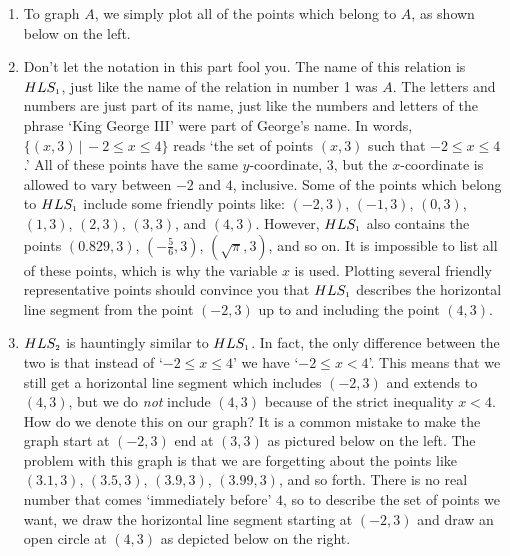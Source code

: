 {
\begin{enumerate}

\item  To graph $A$, we simply plot all of the points which belong to $A$, as shown below on the left.

\item  Don't let the notation in this part fool you.  The name of this relation is $HLS_{\mbox{\tiny$1$}}$, just like the name of the relation in number 1 was $A$.  The letters and numbers are just part of its name, just like the numbers and letters of the phrase `King George III' were part of George's name.  In words,  $\{ (x,3)\, | \, -2 \leq x \leq 4 \}$  reads `the set of points $(x,3)$ such that $-2 \leq x \leq 4$.'   All of these points have the same $y$-coordinate, $3$, but the $x$-coordinate is allowed to vary between $-2$ and $4$, inclusive.  Some of the points which belong to $HLS_{\mbox{\tiny$1$}}$ include some friendly points like:  $(-2,3)$, $(-1,3)$, $(0,3)$, $(1,3)$, $(2,3)$, $(3,3)$, and $(4,3)$.  However, $HLS_{\mbox{\tiny$1$}}$ also contains the points $(0.829, 3)$, $\left(-\frac{5}{6}, 3\right)$, $( \sqrt{\pi}, 3)$, and so on.  It is impossible to list all of these points, which is why the variable $x$ is used.  Plotting several friendly representative points should convince you that $HLS_{\mbox{\tiny$1$}}$ describes the horizontal line segment from the point $(-2,3)$ up to and including the point $(4,3)$.




\item  $HLS_{\mbox{\tiny$2$}}$ is hauntingly similar to $HLS_{\mbox{\tiny$1$}}$.  In fact, the only difference between the two is that instead of `$-2 \leq x \leq 4$' we have `$-2 \leq x < 4$'. This means that we still get a horizontal line segment which includes $(-2,3)$ and extends to $(4,3)$, but we do \emph{not} include $(4,3)$ because of the strict inequality $x < 4$.   How do we denote this on our graph?  It is a common mistake to make the graph start at $(-2,3)$ end at $(3,3)$ as pictured below on the left.  The problem with this graph is that we are forgetting about the points like $(3.1, 3)$, $(3.5, 3)$, $(3.9, 3)$, $(3.99, 3)$, and so forth.  There is no real number that comes `immediately before' $4$, so to describe the set of points we want, we draw the horizontal line segment starting at $(-2,3)$ and draw an open circle at $(4,3)$ as depicted below on the right.


\end{enumerate}}
